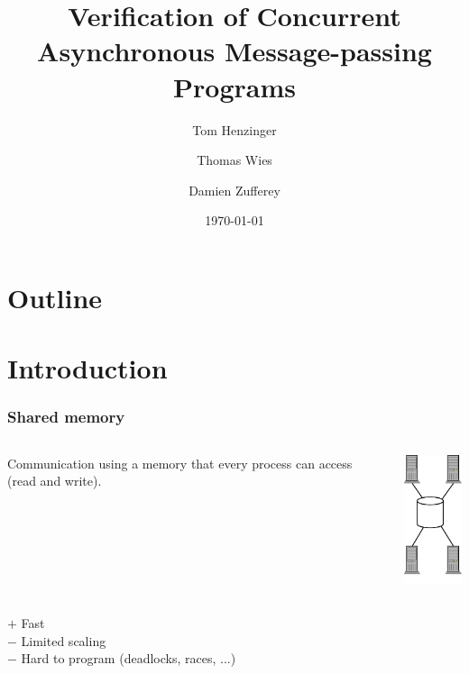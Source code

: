 \documentclass{beamer}
\title[Verifying actors]{Verification of Concurrent Asynchronous Message-passing Programs}
\author{Tom Henzinger \and Thomas Wies \and \alert{Damien Zufferey}}
\institute{
  \'Ecole Polytechnique F\'ed\'erale de Lausanne
}
\date{\today}
\theoremstyle{remark}
\theoremstyle{definition}
\begin{document}
\frame[plain]{\titlepage}
%
%
%
%
%
%
%


\section*{Outline}
\begin{frame}
\tableofcontents
\end{frame}

\section{Introduction}

\begin{frame}
  \frametitle{Shared memory}
  
  \begin{columns}
  \column{5cm}
  Communication using a memory that every process can access (read and write).

  \column{5cm}
  \centering
  \includegraphics[width=2cm]{shared}
  \end{columns}

  $+$ Fast \\
  $-$ Limited scaling \\
  $-$ Hard to program (deadlocks, races, ...)
\end{frame}
\end{document}
